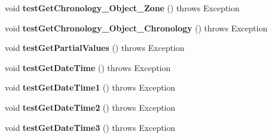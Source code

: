 \begin{DoxyCompactItemize}
\item 
\hypertarget{classorg_1_1joda_1_1time_1_1convert_1_1_test_string_converter_a9ecf3e4bd8291dce01a9ba826c8fa7e4}{void {\bfseries test\-Get\-Chronology\-\_\-\-Object\-\_\-\-Zone} ()  throws Exception }\label{classorg_1_1joda_1_1time_1_1convert_1_1_test_string_converter_a9ecf3e4bd8291dce01a9ba826c8fa7e4}

\item 
\hypertarget{classorg_1_1joda_1_1time_1_1convert_1_1_test_string_converter_ad2899bc27600892cfec87ba208b9114b}{void {\bfseries test\-Get\-Chronology\-\_\-\-Object\-\_\-\-Chronology} ()  throws Exception }\label{classorg_1_1joda_1_1time_1_1convert_1_1_test_string_converter_ad2899bc27600892cfec87ba208b9114b}

\item 
\hypertarget{classorg_1_1joda_1_1time_1_1convert_1_1_test_string_converter_a1bc638bc0028e2b2032aacaa512899c5}{void {\bfseries test\-Get\-Partial\-Values} ()  throws Exception }\label{classorg_1_1joda_1_1time_1_1convert_1_1_test_string_converter_a1bc638bc0028e2b2032aacaa512899c5}

\item 
\hypertarget{classorg_1_1joda_1_1time_1_1convert_1_1_test_string_converter_a44e2cb29d72bfb928471dda5cd7095e2}{void {\bfseries test\-Get\-Date\-Time} ()  throws Exception }\label{classorg_1_1joda_1_1time_1_1convert_1_1_test_string_converter_a44e2cb29d72bfb928471dda5cd7095e2}

\item 
\hypertarget{classorg_1_1joda_1_1time_1_1convert_1_1_test_string_converter_ad385078bc5840270131df7d8d62603bb}{void {\bfseries test\-Get\-Date\-Time1} ()  throws Exception }\label{classorg_1_1joda_1_1time_1_1convert_1_1_test_string_converter_ad385078bc5840270131df7d8d62603bb}

\item 
\hypertarget{classorg_1_1joda_1_1time_1_1convert_1_1_test_string_converter_a33c70a2ecbdd2c760cbc98e13e38a1f8}{void {\bfseries test\-Get\-Date\-Time2} ()  throws Exception }\label{classorg_1_1joda_1_1time_1_1convert_1_1_test_string_converter_a33c70a2ecbdd2c760cbc98e13e38a1f8}

\item 
\hypertarget{classorg_1_1joda_1_1time_1_1convert_1_1_test_string_converter_a03a04758e73677931ae2c5d02317751e}{void {\bfseries test\-Get\-Date\-Time3} ()  throws Exception }\label{classorg_1_1joda_1_1time_1_1convert_1_1_test_string_converter_a03a04758e73677931ae2c5d02317751e}


\end{DoxyCompactItemize}
